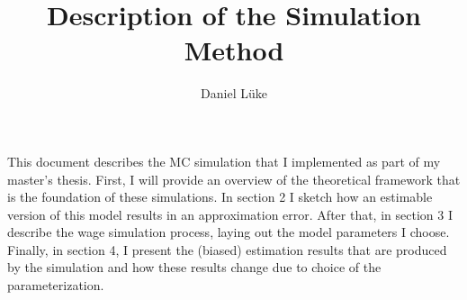 \documentclass{article}
\title{Description of the Simulation Method}
\author{Daniel Lüke}
\begin{document}
\maketitle

	This document describes the MC simulation that I implemented as part of my master's thesis. First, I will provide an overview of the theoretical framework that is the foundation of these simulations. In section 2 I sketch how an estimable version of this model results in an approximation error. After that, in section 3 I describe the wage simulation process, laying out the model parameters I choose. Finally, in section 4, I present the (biased) estimation results that are produced by the simulation and how these results change due to choice of the parameterization.\\
\end{document}
